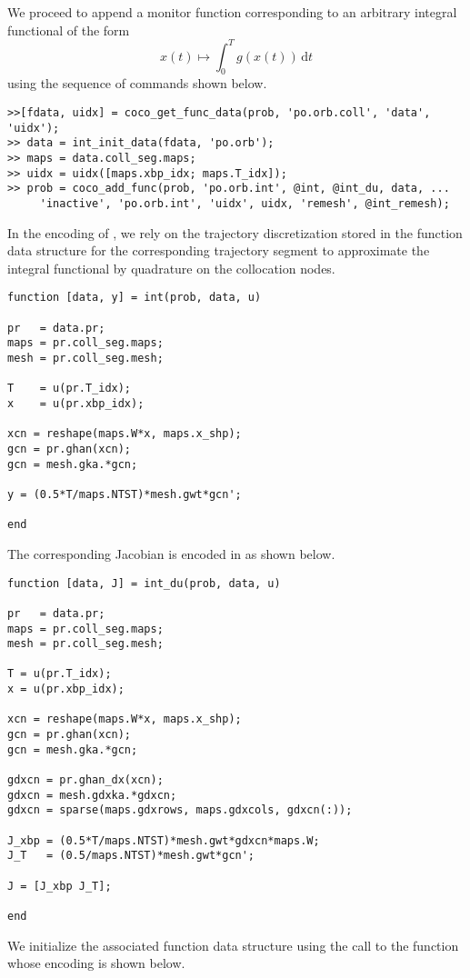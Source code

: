 We proceed to append a monitor function corresponding to an arbitrary integral functional of the form
\begin{equation}
x(t)\mapsto\int_0^Tg(x(t))\,\mathrm{d}t
\end{equation}
using the  sequence of commands shown below.
\begin{lstlisting}[language=coco-highlight]
>>[fdata, uidx] = coco_get_func_data(prob, 'po.orb.coll', 'data', 'uidx');
>> data = int_init_data(fdata, 'po.orb');
>> maps = data.coll_seg.maps;
>> uidx = uidx([maps.xbp_idx; maps.T_idx]);
>> prob = coco_add_func(prob, 'po.orb.int', @int, @int_du, data, ...
     'inactive', 'po.orb.int', 'uidx', uidx, 'remesh', @int_remesh);
\end{lstlisting}
In the encoding of , we rely on the trajectory discretization stored in the function data structure for the corresponding  trajectory segment to approximate the integral functional by quadrature on the collocation nodes.
\begin{lstlisting}[language=coco-highlight]
function [data, y] = int(prob, data, u)

pr   = data.pr;
maps = pr.coll_seg.maps;
mesh = pr.coll_seg.mesh;

T    = u(pr.T_idx);
x    = u(pr.xbp_idx);

xcn = reshape(maps.W*x, maps.x_shp);
gcn = pr.ghan(xcn);
gcn = mesh.gka.*gcn;

y = (0.5*T/maps.NTST)*mesh.gwt*gcn';

end
\end{lstlisting}
The corresponding Jacobian is encoded in  as shown below.
\begin{lstlisting}[language=coco-highlight]
function [data, J] = int_du(prob, data, u)

pr   = data.pr;
maps = pr.coll_seg.maps;
mesh = pr.coll_seg.mesh;

T = u(pr.T_idx);
x = u(pr.xbp_idx);

xcn = reshape(maps.W*x, maps.x_shp);
gcn = pr.ghan(xcn);
gcn = mesh.gka.*gcn;

gdxcn = pr.ghan_dx(xcn);
gdxcn = mesh.gdxka.*gdxcn;
gdxcn = sparse(maps.gdxrows, maps.gdxcols, gdxcn(:));

J_xbp = (0.5*T/maps.NTST)*mesh.gwt*gdxcn*maps.W;
J_T   = (0.5/maps.NTST)*mesh.gwt*gcn';

J = [J_xbp J_T];

end
\end{lstlisting}
We initialize the associated function data structure using the call to the  function whose encoding is shown below.
